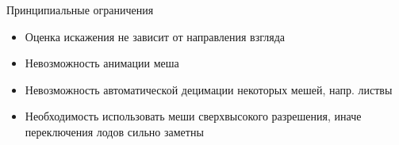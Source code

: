 \begin{frame}{Принципиальные ограничения}
    \begin{itemize}
        \item Оценка искажения не зависит от направления взгляда
        \item Невозможность анимации меша
        \item Невозможность автоматической децимации некоторых мешей, напр. листвы
        \item Необходимость использовать меши сверхвысокого разрешения, иначе переключения лодов сильно заметны
    \end{itemize}
\end{frame}



